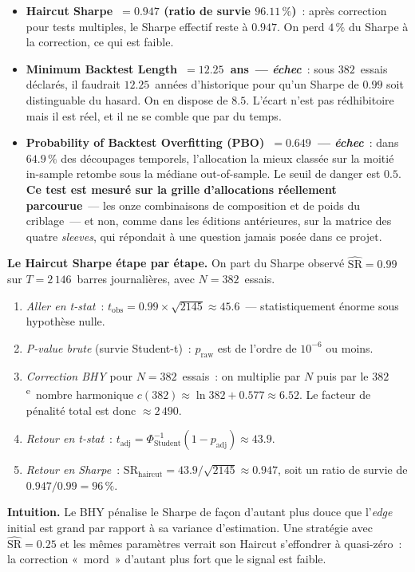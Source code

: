 \begin{itemize}
\item \textbf{Haircut Sharpe~$= 0.947$ (ratio de survie $96.11\,\%$)}~: après correction pour tests multiples, le Sharpe effectif reste à $0.947$. On perd $4\,\%$ du Sharpe à la correction, ce qui est faible.
\item \textbf{Minimum Backtest Length~$= 12.25$~ans~--- \emph{échec}}~: sous $382$~essais déclarés, il faudrait $12.25$~années d'historique pour qu'un Sharpe de $0.99$ soit distinguable du hasard. On en dispose de $8.5$. L'écart n'est pas rédhibitoire mais il est réel, et il ne se comble que par du temps.
\item \textbf{Probability of Backtest Overfitting (PBO)~$= 0.649$~--- \emph{échec}}~: dans $64.9\,\%$ des découpages temporels, l'allocation la mieux classée sur la moitié in-sample retombe sous la médiane out-of-sample. Le seuil de danger est $0.5$. \textbf{Ce test est mesuré sur la grille d'allocations réellement parcourue}~--- les onze combinaisons de composition et de poids du criblage~--- et non, comme dans les éditions antérieures, sur la matrice des quatre \emph{sleeves}, qui répondait à une question jamais posée dans ce projet.
\end{itemize}

\begin{examplebox}
\textbf{Le Haircut Sharpe étape par étape.} On part du Sharpe observé $\widehat{\mathrm{SR}} = 0.99$ sur $T = 2\,146$~barres journalières, avec $N = 382$~essais.

\begin{enumerate}
\item \emph{Aller en t-stat}~: $t_{\text{obs}} = 0.99 \times \sqrt{2145} \approx 45.6$~--- statistiquement énorme sous hypothèse nulle.
\item \emph{P-value brute} (survie Student-t)~: $p_{\text{raw}}$ est de l'ordre de $10^{-6}$ ou moins.
\item \emph{Correction BHY} pour $N = 382$~essais~: on multiplie par $N$ puis par le $382$\textsuperscript{e}~nombre harmonique $c(382) \approx \ln 382 + 0.577 \approx 6.52$. Le facteur de pénalité total est donc $\approx 2\,490$.
\item \emph{Retour en t-stat}~: $t_{\text{adj}} = \Phi^{-1}_{\text{Student}}(1 - p_{\text{adj}}) \approx 43.9$.
\item \emph{Retour en Sharpe}~: $\mathrm{SR}_{\text{haircut}} = 43.9 / \sqrt{2145} \approx 0.947$, soit un ratio de survie de $0.947 / 0.99 = 96\,\%$.
\end{enumerate}

\textbf{Intuition.} Le BHY pénalise le Sharpe de façon d'autant plus douce que l'\emph{edge} initial est grand par rapport à sa variance d'estimation. Une stratégie avec $\widehat{\mathrm{SR}} = 0.25$ et les mêmes paramètres verrait son Haircut s'effondrer à quasi-zéro~: la correction «~mord~» d'autant plus fort que le signal est faible.
\end{examplebox}

